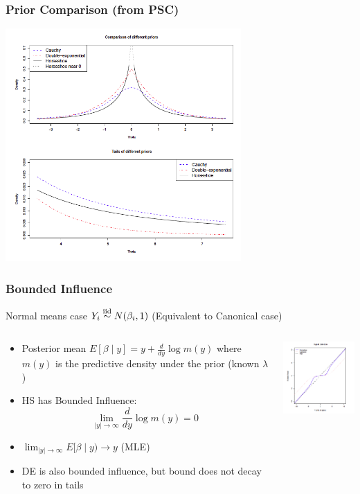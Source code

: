 \documentclass[handout]{beamer}
\begin{document}
\begin{frame}
\frametitle{Prior Comparison (from PSC)}
  \includegraphics[height=3.5in]{densities}
\end{frame}

\begin{frame}
  \frametitle{Bounded Influence}
Normal means case      $Y_i \mathrel{\mathop{\sim}\limits^{\rm iid}} N(\beta_i, 1)$    (Equivalent to Canonical case)
    \begin{columns}
    \begin{column}{.48\textwidth}
      \begin{itemize}
      \item
Posterior mean
$E[\beta \mid y] = y + \frac{d} {d y} \log m(y)$
where $m(y)$ is the predictive density under the prior (known $\lambda$) \pause
\item HS has Bounded Influence: $$\lim_{|y| \to \infty} \frac{d}{dy} \log m(y) = 0$$ \pause
\item $\lim_{|y| \to \infty} E[\beta \mid y) \to y $ (MLE)\pause
\item DE is also bounded influence, but bound does not decay to zero in tails
      \end{itemize}

    \end{column}
    \begin{column}{.48\textwidth}
   \includegraphics[width=2in]{shrinkage}
    \end{column}

    \end{columns}
\end{frame}
\end{document}

